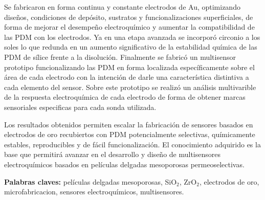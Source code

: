 
Se fabricaron en forma continua y constante electrodos de Au, optimizando diseños, condiciones de depósito, sustratos y funcionalizaciones superficiales, de forma de mejorar el desempeño electroquímico y aumentar la compatibilidad de las PDM con los electrodos. Ya en una etapa avanzada se incorporó circonio a los soles lo que redunda en un aumento significativo de la estabilidad química de las PDM de sílice frente a la disolución. Finalmente se fabricó un multisensor prototipo funcionalizando las PDM en forma localizada específicamente sobre el área de cada electrodo con la intención de darle una característica distintiva a cada elemento del sensor. Sobre este prototipo se realizó un análisis multivarible de la respuesta electroquímica de cada electrodo de forma de obtener marcas sensoriales especificas para cada sonda utilizada.

Los resultados obtenidos permiten escalar la fabricación de sensores basados en electrodos de oro recubiertos con PDM potencialmente selectivas, químicamente estables, reproducibles y de fácil funcionalización. El conocimiento adquirido es la base que permitirá avanzar en el desarrollo y diseño de multisensores electroquímicos basados en películas delgadas mesoporosas permeoselectivas. 
\vspace*{\fill}

\vfill
\noindent\textbf{Palabras claves:} películas delgadas mesoporosas, SiO$_2$, ZrO$_2$, electrodos de oro, microfabricacion, sensores electroquímicos, multisensores.

\cleardoublepage

